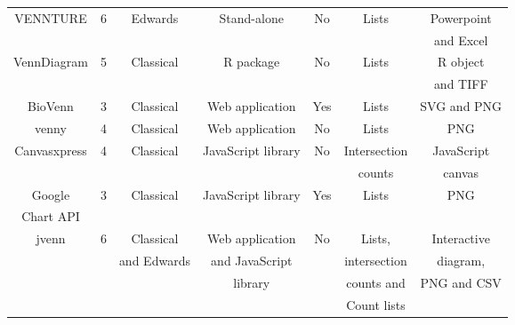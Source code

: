\documentclass{bmcart}
\begin{document}
\begin{backmatter}
\begin{table}[h!]
\begin{tabular}{c|cccccc}
		VENNTURE \cite{Bronwen2012} &  6 & Edwards & Stand-alone & No & Lists &
		Powerpoint\\ 
		& & & & & & and Excel \\ \hline
		
		VennDiagram \cite{RVennDiagram} &  5 & Classical & R package & No & Lists
		& R object \\
		& & & & & & and TIFF \\ \hline
		
		BioVenn \cite{Hulsen2008} &  3 & Classical & Web application & Yes &
		Lists & SVG and PNG \\ \hline
		
		venny \cite{venny} &  4 & Classical & Web application & No &
		Lists & PNG \\ \hline
		 
		Canvasxpress \cite{canvasxpress} &  4 & Classical & JavaScript library &
		No & Intersection & JavaScript \\
		& & & & & counts & canvas \\ \hline
		
		Google & 3 & Classical & JavaScript library &
		Yes & Lists & PNG \\ 
		Chart API \cite{googleAPI} & & & & & & \\ \hline \hline
			
		jvenn & 6 & Classical & Web application & No & Lists,
		& Interactive 
		\\
		& & and Edwards & and JavaScript & & intersection & diagram, \\
		& & & library & & counts and & PNG and CSV \\
		& & & & & Count lists & 
	\end{tabular}
\end{table}



\end{backmatter}
\end{document}
